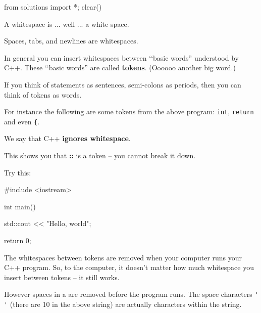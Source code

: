 \begin{python0}
from solutions import *; clear()
\end{python0}

A whitespace is ... well ... a white space.

Spaces, tabs, and newlines are whitespaces.




In general you can insert whitespaces between 
\lq\lq basic words'' understood by C++. 
These \lq\lq basic words'' are called \textbf{tokens}. 
(Oooooo another big word.)

If you think of statements as sentences, 
semi-colons as periods, then you can think of tokens as words.


For instance the following are some tokens from the above program: 
\texttt{int}, \texttt{return} and even \texttt{\{}.

We say that C++ \textbf{ignores whitespace}. 




This shows you that \textbf{::} is a token -- you cannot break it down.



Try this:
\begin{console}
#include <iostream>

int main()
{
    std::cout << "Hello,          world\n";

    return 0;
}
\end{console}

The whitespaces between tokens are removed when your computer runs your C++ program. So, to the computer, it doesn't matter how much whitespace you insert between tokens -- it still works.

However spaces in a  
are  removed before the program runs. 
The space characters \verb!' '!
(there are 10 in the above string) are actually characters within the string.

